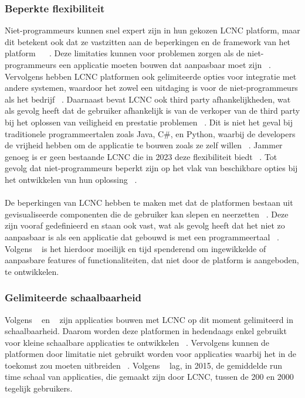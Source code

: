 \subsubsection{Beperkte flexibiliteit}
\label{subsec:beperkte-flexibiliteit}
Niet-programmeurs kunnen snel expert zijn in hun gekozen LCNC platform, maar dit betekent ook dat ze vastzitten aan de beperkingen en de framework van het platform 
~\autocite{Sufi_2023} ~\autocite{Talesra_2021}. 
Deze limitaties kunnen voor problemen zorgen als de niet-programmeurs een applicatie moeten bouwen dat aanpasbaar moet zijn ~\autocite{Talesra_2021}. 
Vervolgens hebben LCNC platformen ook gelimiteerde opties voor integratie met andere systemen, waardoor het zowel een uitdaging is voor de niet-programmeurs als 
het bedrijf ~\autocite{Talesra_2021}. Daarnaast bevat LCNC ook third party afhankelijkheden, wat als gevolg heeft dat de gebruiker afhankelijk is van de verkoper van de 
third party bij het oplossen van veiligheid en prestatie problemen ~\autocite{Talesra_2021}. Dit is niet het geval bij traditionele programmeertalen zoals Java, C\#, en Python, 
waarbij de developers de vrijheid hebben om de applicatie te bouwen zoals ze zelf willen ~\autocite{Sufi_2023}. Jammer genoeg is er geen bestaande LCNC die in 2023 deze 
flexibiliteit biedt ~\autocite{Sufi_2023}. Tot gevolg dat niet-programmeurs beperkt zijn op het vlak van beschikbare opties bij het ontwikkelen van hun oplossing ~\autocite{Sufi_2023}. 
\\
\\
De beperkingen van LCNC hebben te maken met dat de platformen bestaan uit gevisualiseerde componenten die de gebruiker kan slepen en
 neerzetten ~\autocite{Yan2021}. Deze zijn vooraf gedefinieerd en staan ook vast, wat als gevolg heeft dat het niet zo aanpasbaar is als een applicatie 
 dat gebouwd is met een programmeertaal ~\autocite{Yan2021}. Volgens ~\textcite{Yan2021} 
is het hierdoor moeilijk en tijd spenderend om ingewikkelde of aanpasbare features of functionaliteiten, dat niet door de platform is aangeboden, te ontwikkelen.
\subsubsection*{Gelimiteerde schaalbaarheid}
\label{subsec:gelimiteerde-schaalbaarheid}
Volgens ~\textcite{Elshan2023} en ~\textcite{Sufi_2023} zijn applicaties bouwen met LCNC op dit moment gelimiteerd in schaalbaarheid. Daarom worden deze platformen in hedendaags enkel gebruikt voor kleine schaalbare applicaties te ontwikkelen ~\autocite{Sufi_2023}. 
Vervolgens kunnen de platformen door limitatie niet gebruikt worden voor applicaties waarbij het in de toekomst zou moeten uitbreiden ~\autocite{Elshan2023}. 
Volgens ~\textcite{Yan2021} lag, in 2015, de gemiddelde run time schaal van applicaties, die gemaakt zijn door LCNC, tussen de 200 en 2000 tegelijk gebruikers.

